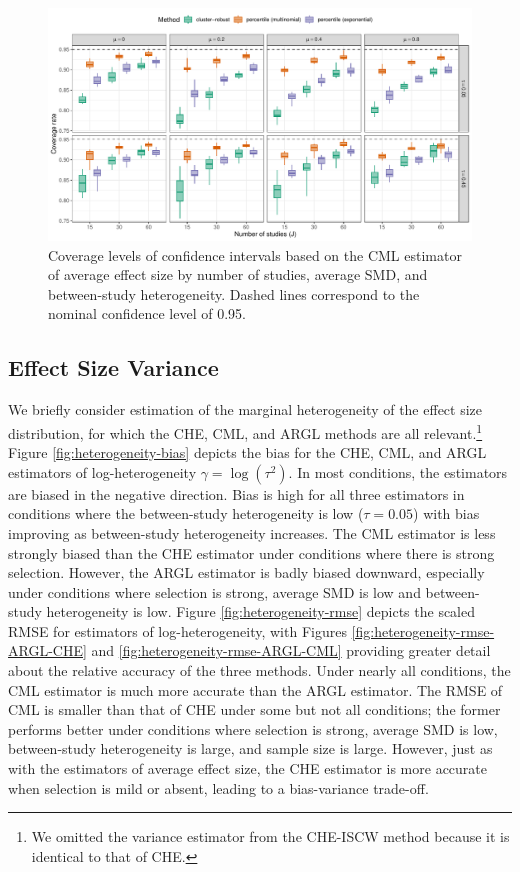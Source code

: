 \documentclass[
  man, donotrepeattitle,floatsintext]{apa7}
\begin{document}
\begin{figure}
\includegraphics{selection_models_draft_files/figure-latex/CML-coverage-1} \caption{Coverage levels of confidence intervals based on the CML estimator of average effect size by number of studies, average SMD, and between-study heterogeneity. Dashed lines correspond to the nominal confidence level of 0.95.}\label{fig:CML-coverage}
\end{figure}

\subsection{Effect Size Variance}\label{effect-size-variance}

We briefly consider estimation of the marginal heterogeneity of the effect size distribution, for which the CHE, CML, and ARGL methods are all relevant.\footnote{We omitted the variance estimator from the CHE-ISCW method because it is identical to that of CHE.}
Figure \ref{fig:heterogeneity-bias} depicts the bias for the CHE, CML, and ARGL estimators of log-heterogeneity \(\gamma = \log(\tau^2)\).
In most conditions, the estimators are biased in the negative direction. Bias is high for all three estimators in conditions where the between-study heterogeneity is low (\(\tau = 0.05\)) with bias improving as between-study heterogeneity increases. The CML estimator is less strongly biased than the CHE estimator under conditions where there is strong selection.
However, the ARGL estimator is badly biased downward, especially under conditions where selection is strong, average SMD is low and between-study heterogeneity is low.
Figure \ref{fig:heterogeneity-rmse} depicts the scaled RMSE for estimators of log-heterogeneity, with Figures \ref{fig:heterogeneity-rmse-ARGL-CHE} and \ref{fig:heterogeneity-rmse-ARGL-CML} providing greater detail about the relative accuracy of the three methods.
Under nearly all conditions, the CML estimator is much more accurate than the ARGL estimator.
The RMSE of CML is smaller than that of CHE under some but not all conditions; the former performs better under conditions where selection is strong, average SMD is low, between-study heterogeneity is large, and sample size is large.
However, just as with the estimators of average effect size, the CHE estimator is more accurate when selection is mild or absent, leading to a bias-variance trade-off.
\end{document}
